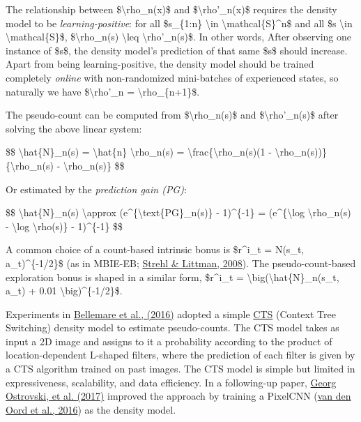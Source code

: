 The relationship between \$\textbackslash rho\_n(x)\$ and \$\textbackslash rho'\_n(x)\$ requires the density model to be \emph{learning-positive}: for all \$s\_\{1:n\} \textbackslash in \textbackslash mathcal\{S\}\^{}n\$ and all \$s \textbackslash in \textbackslash mathcal\{S\}\$, \$\textbackslash rho\_n(s) \textbackslash leq \textbackslash rho'\_n(s)\$. In other words, After observing one instance of \$s\$, the density model's prediction of that same \$s\$ should increase. Apart from being learning-positive, the density model should be trained completely \emph{online} with non-randomized mini-batches of experienced states, so naturally we have \$\textbackslash rho'\_n = \textbackslash rho\_\{n+1\}\$.

The pseudo-count can be computed from \$\textbackslash rho\_n(s)\$ and \$\textbackslash rho'\_n(s)\$ after solving the above linear system:

\$\$ \textbackslash hat\{N\}\_n(s) = \textbackslash hat\{n\} \textbackslash rho\_n(s) = \textbackslash frac\{\textbackslash rho\_n(s)(1 - \textbackslash rho\textquotesingle\_n(s))\}\{\textbackslash rho\textquotesingle\_n(s) - \textbackslash rho\_n(s)\} \$\$

Or estimated by the \emph{prediction gain (PG)}:

\$\$ \textbackslash hat\{N\}\_n(s) \textbackslash approx (e\^{}\{\textbackslash text\{PG\}\_n(s)\} - 1)\^{}\{-1\} = (e\^{}\{\textbackslash log \textbackslash rho\textquotesingle\_n(s) - \textbackslash log \textbackslash rho(s)\} - 1)\^{}\{-1\} \$\$

A common choice of a count-based intrinsic bonus is \$r\^{}i\_t = N(s\_t, a\_t)\^{}\{-1/2\}\$ (as in MBIE-EB; \href{https://www.ics.uci.edu/~dechter/courses/ics-295/fall-2019/papers/2008-littman-aij-main.pdf}{Strehl \& Littman, 2008}). The pseudo-count-based exploration bonus is shaped in a similar form, \$r\^{}i\_t = \textbackslash big(\textbackslash hat\{N\}\_n(s\_t, a\_t) + 0.01 \textbackslash big)\^{}\{-1/2\}\$.

Experiments in \href{https://arxiv.org/abs/1606.01868}{Bellemare et al., (2016)} adopted a simple \href{http://proceedings.mlr.press/v32/bellemare14.html}{CTS} (Context Tree Switching) density model to estimate pseudo-counts. The CTS model takes as input a 2D image and assigns to it a probability according to the product of location-dependent L-shaped filters, where the prediction of each filter is given by a CTS algorithm trained on past images. The CTS model is simple but limited in expressiveness, scalability, and data efficiency. In a following-up paper, \href{https://arxiv.org/abs/1703.01310}{Georg Ostrovski, et al. (2017)} improved the approach by training a PixelCNN (\href{https://arxiv.org/abs/1606.05328}{van den Oord et al., 2016}) as the density model.

